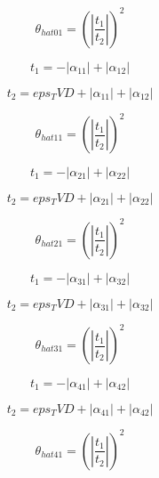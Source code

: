 \documentclass{article}
\begin{document}
\begin{dmath}\theta_{hat 01} = \left(\left|{\frac{t_{1}}{t_{2}}}\right| \right)^{2}\end{dmath}

\begin{dmath}t_{1} = - \left|{\alpha_{11}}\right| + \left|{\alpha_{12}}\right|\end{dmath}

\begin{dmath}t_{2} = eps_TVD + \left|{\alpha_{11}}\right| + \left|{\alpha_{12}}\right|\end{dmath}

\begin{dmath}\theta_{hat 11} = \left(\left|{\frac{t_{1}}{t_{2}}}\right| \right)^{2}\end{dmath}

\begin{dmath}t_{1} = - \left|{\alpha_{21}}\right| + \left|{\alpha_{22}}\right|\end{dmath}

\begin{dmath}t_{2} = eps_TVD + \left|{\alpha_{21}}\right| + \left|{\alpha_{22}}\right|\end{dmath}

\begin{dmath}\theta_{hat 21} = \left(\left|{\frac{t_{1}}{t_{2}}}\right| \right)^{2}\end{dmath}

\begin{dmath}t_{1} = - \left|{\alpha_{31}}\right| + \left|{\alpha_{32}}\right|\end{dmath}

\begin{dmath}t_{2} = eps_TVD + \left|{\alpha_{31}}\right| + \left|{\alpha_{32}}\right|\end{dmath}

\begin{dmath}\theta_{hat 31} = \left(\left|{\frac{t_{1}}{t_{2}}}\right| \right)^{2}\end{dmath}

\begin{dmath}t_{1} = - \left|{\alpha_{41}}\right| + \left|{\alpha_{42}}\right|\end{dmath}

\begin{dmath}t_{2} = eps_TVD + \left|{\alpha_{41}}\right| + \left|{\alpha_{42}}\right|\end{dmath}

\begin{dmath}\theta_{hat 41} = \left(\left|{\frac{t_{1}}{t_{2}}}\right| \right)^{2}\end{dmath}
\end{document}
